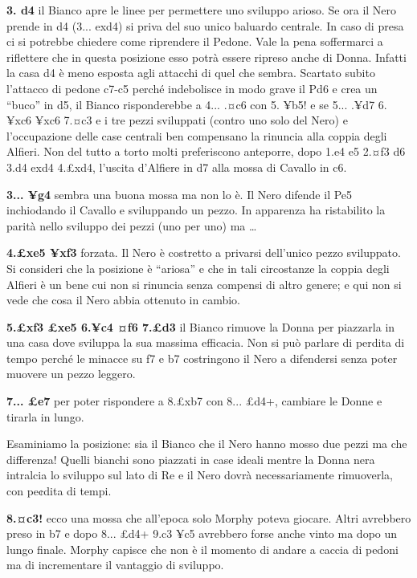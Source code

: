 \textbf{3. d4} il Bianco apre le linee per permettere uno sviluppo
arioso. Se ora il Nero prende in d4 (3... exd4) si priva del suo unico
baluardo centrale. In caso di presa ci si potrebbe chiedere come
riprendere il Pedone. Vale la pena soffermarci a riflettere che in
questa posizione esso potrà essere ripreso anche di Donna. Infatti la
casa d4 è meno esposta agli attacchi di quel che sembra. Scartato subito
l'attacco di pedone c7-c5 perché indebolisce in modo grave il Pd6 e crea
un ``buco'' in d5, il Bianco risponderebbe a 4... .¤c6 con 5. ¥b5! e se
5... .¥d7 6. ¥xc6 ¥xc6 7.¤c3 e i tre pezzi sviluppati (contro uno solo
del Nero) e l'occupazione delle case centrali ben compensano la rinuncia
alla coppia degli Alfieri. Non del tutto a torto molti preferiscono
anteporre, dopo 1.e4 e5 2.¤f3 d6 3.d4 exd4 4.£xd4, l'uscita d'Alfiere in
d7 alla mossa di Cavallo in c6.

\textbf{3... ¥g4} sembra una buona mossa ma non lo è. Il Nero difende il
Pe5 inchiodando il Cavallo e sviluppando un pezzo. In apparenza ha
ristabilito la parità nello sviluppo dei pezzi (uno per uno) ma \ldots{}

\textbf{4.£xe5 ¥xf3} forzata. Il Nero è costretto a privarsi dell'unico
pezzo sviluppato. Si consideri che la posizione è ``ariosa'' e che in
tali circostanze la coppia degli Alfieri è un bene cui non si rinuncia
senza compensi di altro genere; e qui non si vede che cosa il Nero abbia
ottenuto in cambio.

\textbf{5.£xf3 £xe5 6.¥c4 ¤f6 7.£d3} il Bianco rimuove la Donna per
piazzarla in una casa dove sviluppa la sua massima efficacia. Non si può
parlare di perdita di tempo perché le minacce su f7 e b7 costringono il
Nero a difendersi senza poter muovere un pezzo leggero.

\textbf{7... £e7} per poter rispondere a 8.£xb7 con 8... £d4+, cambiare
le Donne e tirarla in lungo.

Esaminiamo la posizione: sia il Bianco che il Nero hanno mosso due pezzi
ma che differenza! Quelli bianchi sono piazzati in case ideali mentre la
Donna nera intralcia lo sviluppo sul lato di Re e il Nero dovrà
necessariamente rimuoverla, con pe¢dita di tempi.

\textbf{8.¤c3!} ecco una mossa che all'epoca solo Morphy poteva giocare.
Altri avrebbero preso in b7 e dopo 8... £d4+ 9.c3 ¥c5 avrebbero forse
anche vinto ma dopo un lungo finale. Morphy capisce che non è il momento
di andare a caccia di pedoni ma di incrementare il vantaggio di
sviluppo.


